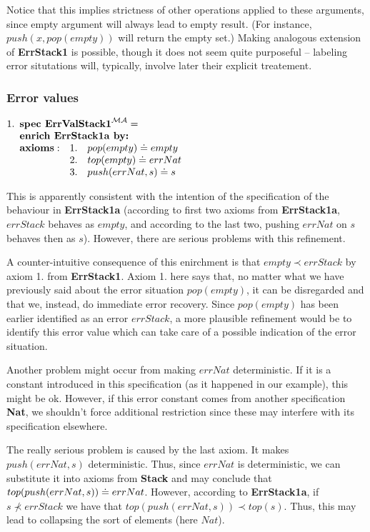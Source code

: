 \documentclass[10pt]{article}
\begin{document}
\noindent
Notice that this implies strictness of other operations applied to these
arguments, since empty argument will always lead to empty result.  (For
instance, $push(x,pop(empty))$ will return the empty set.) Making
analogous extension of {\bf ErrStack1} is possible, though it does not seem
quite purposeful -- labeling error situtations will, typically, involve later
their explicit treatement.

\subsubsection{Error values}\label{subsub:er4}
\hspace*{1.2em}
\(
1. \spec{	\tit{\mbox{\bf spec\ ErrValStack1}^{\inst{MA}}=} \\
	\tit{\mbox{\bf enrich\ ErrStack1a\  by:}} \\
	 	{\bf axioms:}
			&1.& pop(empty) \eleq empty \\
			&2.& top(empty) \eleq errNat \\
			&3.& push(errNat,s) \eleq s
}
\) 

\noindent
This is apparently consistent with the intention of the specification of the
behaviour in {\bf ErrStack1a} (according to first two axioms from {\bf
ErrStack1a}, $errStack$ behaves as $empty$, and according to the last two,
pushing $errNat$ on $s$ behaves then as $s$). However, there are serious
problems with this refinement.

A counter-intuitive consequence of this enirchment is that $empty\prec
errStack$ by axiom 1. from {\bf ErrStack1}. Axiom 1. here says that, no
matter what we have previously said about the error situation $pop(empty)$, it
can be disregarded and that we, instead, do immediate error recovery. 
Since $pop(empty)$ has been earlier
identified as an error $errStack$, a more plausible refinement would be to
identify this
error value which can take care of a possible indication of the error
situation.

Another problem might occur from making $errNat$ deterministic. If it is a
constant introduced in this specification (as it happened in our example),
this might be ok. However, if this error constant comes from another
specification {\bf Nat}, we shouldn't force additional restriction since
these may interfere with its specification elsewhere. 

The really serious problem is caused by the last axiom. It makes $push(errNat,s)$
deterministic. Thus, since $errNat$ is deterministic, we can substitute it into
axioms from {\bf Stack} and may conclude that
$top(push(errNat,s))\mathrel{\dot{=} } errNat$. However, according to  {\bf ErrStack1a},
if $s\not\prec errStack$ we have that $top(push(errNat,s))\prec
top(s)$. Thus, this may lead to collapsing the sort of elements (here $Nat$).
\end{document}
